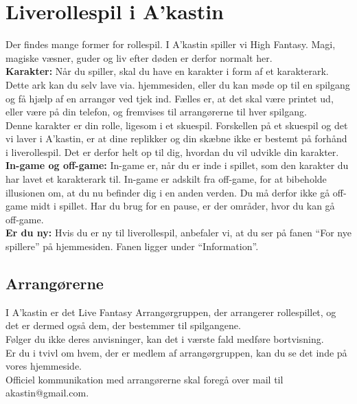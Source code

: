 \chapter{Liverollespil i A’kastin}
Der findes mange former for rollespil. I A’kastin spiller vi High Fantasy. Magi, magiske væsner, guder og liv efter døden er derfor normalt her.\\
\textbf{Karakter:} Når du spiller, skal du have en karakter i form af et karakterark. Dette ark kan du selv lave via. hjemmesiden, eller du kan møde op til en spilgang og få hjælp af en arrangør ved tjek ind. Fælles er, at det skal være printet ud, eller være på din telefon, og fremvises til arrangørerne til hver spilgang.\\
Denne karakter er din rolle, ligesom i et skuespil. Forskellen på et skuespil og det vi laver i A’kastin, er at dine replikker og din skæbne ikke er bestemt på forhånd i liverollespil. Det er derfor helt op til dig, hvordan du vil udvikle din karakter.\\
\textbf{In-game og off-game:} In-game er, når du er inde i spillet, som den karakter du har lavet et karakterark til. In-game er adskilt fra off-game, for at bibeholde illusionen om, at du nu befinder dig i en anden verden. Du må derfor ikke gå off-game midt i spillet. Har du brug for en pause, er der områder, hvor du kan gå off-game.\\
\textbf{Er du ny:} Hvis du er ny til liverollespil, anbefaler vi, at du ser på fanen “For nye spillere” på hjemmesiden. Fanen ligger under “Information”.\\

\section{Arrangørerne}
I A’kastin er det Live Fantasy Arrangørgruppen, der arrangerer rollespillet, og det er dermed også dem, der bestemmer til spilgangene.\\
Følger du ikke deres anvisninger, kan det i værste fald medføre bortvisning.\\
Er du i tvivl om hvem, der er medlem af arrangørgruppen, kan du se det inde på vores hjemmeside.\\
Officiel kommunikation med arrangørerne skal foregå over mail til akastin@gmail.com.\\


